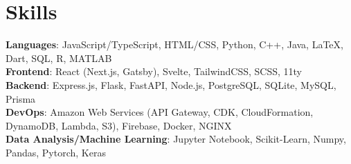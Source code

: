 \documentclass{article}
\begin{document}
\section*{Skills}
\textbf{Languages}: JavaScript/TypeScript, HTML/CSS, Python, C++, Java, {\selectfont\LaTeX}, Dart, SQL, R, MATLAB\\
\textbf{Frontend}: React (Next.js, Gatsby), Svelte, TailwindCSS, SCSS, 11ty\\
\textbf{Backend}: Express.js, Flask, FastAPI, Node.js, PostgreSQL, SQLite, MySQL, Prisma\\
\textbf{DevOps}: Amazon Web Services (API Gateway, CDK, CloudFormation, DynamoDB, Lambda, S3), Firebase, Docker, NGINX\\
\textbf{Data Analysis/Machine Learning}: Jupyter Notebook, Scikit-Learn, Numpy, Pandas, Pytorch, Keras
\end{document}
